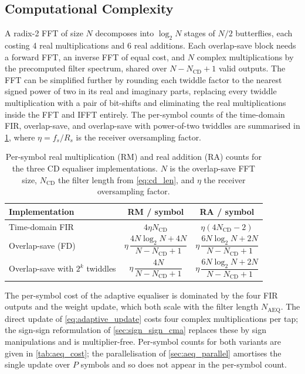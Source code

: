 \documentclass[12pt,a4paper]{report}
\begin{document}
\subsection{Computational Complexity}
A radix-2 FFT of size $N$ decomposes into $\log_2 N$ stages of $N/2$ butterflies, each costing 4 real multiplications and 6 real additions. Each overlap-save block needs a forward FFT, an inverse FFT of equal cost, and $N$ complex multiplications by the precomputed filter spectrum, shared over $N-N_\mathrm{CD}+1$ valid outputs. The FFT can be simplified further by rounding each twiddle factor to the nearest signed power of two in its real and imaginary parts, replacing every twiddle multiplication with a pair of bit-shifts and eliminating the real multiplications inside the FFT and IFFT entirely. The per-symbol counts of the time-domain FIR, overlap-save, and overlap-save with power-of-two twiddles are summarised in \cref{tab:cd_cost}, where $\eta = f_s/R_s$ is the receiver oversampling factor.

\begin{table}[H]
    \centering
    \begin{tabular}{lcc}
        \toprule
        Implementation & RM / symbol & RA / symbol \\
        \midrule
        Time-domain FIR                                 & $4\eta N_\mathrm{CD}$ & $\eta(4N_\mathrm{CD}-2)$ \\
        Overlap-save (FD)                               & $\eta\,\dfrac{4N\log_2 N + 4N}{N - N_\mathrm{CD} + 1}$ & $\eta\,\dfrac{6N\log_2 N + 2N}{N - N_\mathrm{CD} + 1}$ \\[8pt]
        Overlap-save with $2^k$ twiddles                & $\eta\,\dfrac{4N}{N - N_\mathrm{CD} + 1}$              & $\eta\,\dfrac{6N\log_2 N + 2N}{N - N_\mathrm{CD} + 1}$ \\
        \bottomrule
    \end{tabular}
    \caption{Per-symbol real multiplication (RM) and real addition (RA) counts for the three CD equaliser implementations. $N$ is the overlap-save FFT size, $N_\mathrm{CD}$ the filter length from \cref{eq:cd_len}, and $\eta$ the receiver oversampling factor.}
    \label{tab:cd_cost}
\end{table}

The per-symbol cost of the adaptive equaliser is dominated by the four FIR outputs and the weight update, which both scale with the filter length $N_\mathrm{AEQ}$. The direct update of \cref{eq:adaptive_update} costs four complex multiplications per tap; the sign-sign reformulation of \cref{sec:sign_sign_cma} replaces these by sign manipulations and is multiplier-free. Per-symbol counts for both variants are given in \cref{tab:aeq_cost}; the parallelisation of \cref{sec:aeq_parallel} amortises the single update over $P$ symbols and so does not appear in the per-symbol count.
\end{document}

